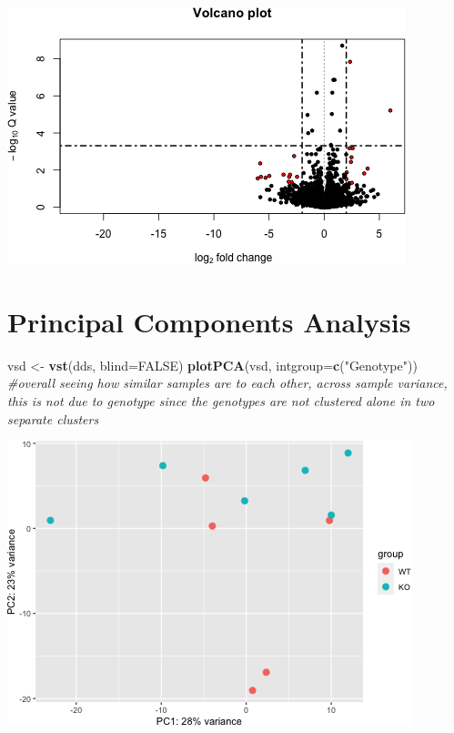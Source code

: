 \documentclass[]{article}
\newenvironment{Shaded}{\begin{snugshade}}{\end{snugshade}}
\newcommand{\CommentTok}[1]{\textcolor[rgb]{0.56,0.35,0.01}{\textit{#1}}}
\newcommand{\DataTypeTok}[1]{\textcolor[rgb]{0.13,0.29,0.53}{#1}}
\newcommand{\KeywordTok}[1]{\textcolor[rgb]{0.13,0.29,0.53}{\textbf{#1}}}
\newcommand{\NormalTok}[1]{#1}
\newcommand{\OtherTok}[1]{\textcolor[rgb]{0.56,0.35,0.01}{#1}}
\newcommand{\StringTok}[1]{\textcolor[rgb]{0.31,0.60,0.02}{#1}}
\begin{document}
\includegraphics{figures-noura/volcano-plot-2.png}

\hypertarget{principal-components-analysis}{%
\section{Principal Components
Analysis}\label{principal-components-analysis}}

\begin{Shaded}
\begin{Highlighting}[]
\NormalTok{vsd <-}\StringTok{ }\KeywordTok{vst}\NormalTok{(dds, }\DataTypeTok{blind=}\OtherTok{FALSE}\NormalTok{)}
\KeywordTok{plotPCA}\NormalTok{(vsd, }\DataTypeTok{intgroup=}\KeywordTok{c}\NormalTok{(}\StringTok{"Genotype"}\NormalTok{)) }\CommentTok{#overall seeing how similar samples are to each other, across sample variance, this is not due to genotype since the genotypes are not clustered alone in two separate clusters}
\end{Highlighting}
\end{Shaded}

\includegraphics{figures-noura/pca-1.png}
\end{document}
